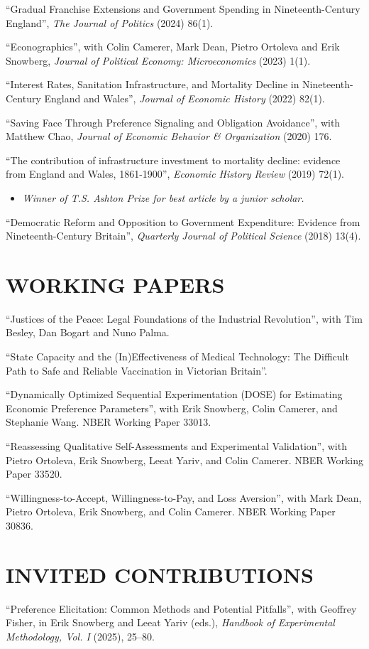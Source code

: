 \documentclass{res}  %
\begin{document}
\begin{resume}
``Gradual Franchise Extensions and Government Spending in Nineteenth-Century England'', \textit{The Journal of Politics} (2024) 86(1).

``Econographics'', with Colin Camerer, Mark Dean, Pietro Ortoleva and Erik Snowberg, \textit{Journal of Political Economy: Microeconomics} (2023) 1(1).

``Interest Rates, Sanitation Infrastructure, and Mortality Decline in Nineteenth-Century England and Wales'', \textit{Journal of Economic History} (2022) 82(1). 

``Saving Face Through Preference Signaling and Obligation Avoidance'', with Matthew Chao, \textit{Journal of Economic Behavior \& Organization} (2020) 176.

``The contribution of infrastructure investment to mortality decline: evidence from England and Wales, 1861-1900'', \textit{Economic History Review} (2019) 72(1). 
\begin{itemize}
\item \textit{Winner of T.S. Ashton Prize for best article by a junior scholar.}
\end{itemize}

``Democratic Reform and Opposition to Government Expenditure: Evidence from Nineteenth-Century Britain'', \textit{Quarterly Journal of Political Science} (2018) 13(4).

\section{WORKING PAPERS}
``Justices of the Peace: Legal Foundations of the Industrial Revolution'', with Tim Besley, Dan Bogart and Nuno Palma. 

``State Capacity and the (In)Effectiveness of Medical Technology: The Difficult Path to Safe and Reliable Vaccination in Victorian Britain''.

``Dynamically Optimized Sequential Experimentation (DOSE) for Estimating Economic Preference Parameters'', with Erik Snowberg, Colin Camerer, and Stephanie Wang. NBER Working Paper 33013.

``Reassessing Qualitative Self-Assessments and Experimental Validation'', with Pietro Ortoleva, Erik Snowberg, Leeat Yariv, and Colin Camerer. NBER Working Paper 33520.

``Willingness-to-Accept, Willingness-to-Pay, and Loss Aversion'', with Mark Dean, Pietro Ortoleva, Erik Snowberg, and Colin Camerer. NBER Working Paper 30836.

\section{INVITED CONTRIBUTIONS}
``Preference Elicitation: Common Methods and Potential Pitfalls'', with Geoffrey Fisher, in Erik Snowberg and Leeat Yariv (eds.), \textit{Handbook of Experimental Methodology, Vol. I} (2025), 25--80.


\end{resume}
\end{document}
